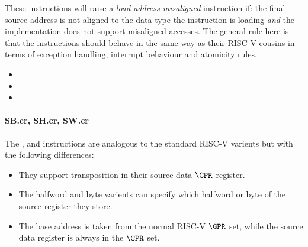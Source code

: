 These instructions will raise a {\em load address misaligned} instruction
if: the final source address is not aligned to the data type the instruction
is loading {\em and} the implementation does not support misaligned accesses.
The general rule here is that the  instructions should behave in
the same way as their RISC-V cousins in terms of exception handling,
interrupt behaviour and atomicity rules.

\begin{itemize}
\item {}
\item {}
\item {}
\end{itemize}


\paragraph{SB.cr, SH.cr, SW.cr}

The ,  and  instructions are analogous to
the standard RISC-V varients but with the following differences:

\begin{itemize}
\item They support transposition in their source data $\CPR$ register.
\item The halfword and byte varients can specify which halfword or byte of
      the source register they store.
\item The base address is taken from the normal RISC-V $\GPR$ set, while the
      source data register is always in the $\CPR$ set.
\end{itemize}

